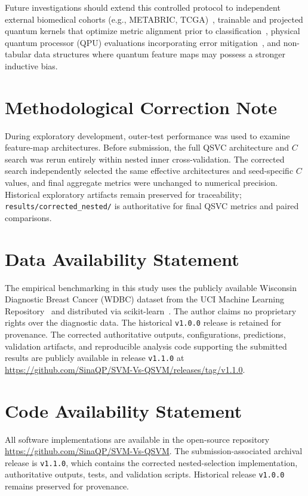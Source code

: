 \documentclass[12pt,a4paper]{article}
\begin{document}
Future investigations should extend this controlled protocol to independent external biomedical cohorts (e.g., METABRIC, TCGA)~\cite{leither2026benchmarking}, trainable and projected quantum kernels that optimize metric alignment prior to classification~\cite{huang2021power, kubler2021inductive}, physical quantum processor (QPU) evaluations incorporating error mitigation~\cite{preskill2018quantum, peters2021machine}, and non-tabular data structures where quantum feature maps may possess a stronger inductive bias.

\section*{Methodological Correction Note}
During exploratory development, outer-test performance was used to examine feature-map architectures. Before submission, the full QSVC architecture and $C$ search was rerun entirely within nested inner cross-validation. The corrected search independently selected the same effective architectures and seed-specific $C$ values, and final aggregate metrics were unchanged to numerical precision. Historical exploratory artifacts remain preserved for traceability; \texttt{results/corrected\_nested/} is authoritative for final QSVC metrics and paired comparisons.

\section*{Data Availability Statement}
The empirical benchmarking in this study uses the publicly available Wisconsin Diagnostic Breast Cancer (WDBC) dataset from the UCI Machine Learning Repository~\cite{street1993nuclear} and distributed via scikit-learn~\cite{pedregosa2011scikit}. The author claims no proprietary rights over the diagnostic data. The historical \texttt{v1.0.0} release is retained for provenance. The corrected authoritative outputs, configurations, predictions, validation artifacts, and reproducible analysis code supporting the submitted results are publicly available in release \texttt{v1.1.0} at \url{https://github.com/SinaQP/SVM-Vs-QSVM/releases/tag/v1.1.0}.

\section*{Code Availability Statement}
All software implementations are available in the open-source repository \url{https://github.com/SinaQP/SVM-Vs-QSVM}. The submission-associated archival release is \texttt{v1.1.0}, which contains the corrected nested-selection implementation, authoritative outputs, tests, and validation scripts. Historical release \texttt{v1.0.0} remains preserved for provenance.
\end{document}
